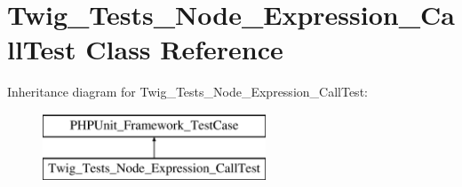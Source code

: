\hypertarget{classTwig__Tests__Node__Expression__CallTest}{}\section{Twig\+\_\+\+Tests\+\_\+\+Node\+\_\+\+Expression\+\_\+\+Call\+Test Class Reference}
\label{classTwig__Tests__Node__Expression__CallTest}
Inheritance diagram for Twig\+\_\+\+Tests\+\_\+\+Node\+\_\+\+Expression\+\_\+\+Call\+Test\+:\begin{figure}[H]
\begin{center}
\leavevmode
\includegraphics[height=2.000000cm]{classTwig__Tests__Node__Expression__CallTest}
\end{center}
\end{figure}
